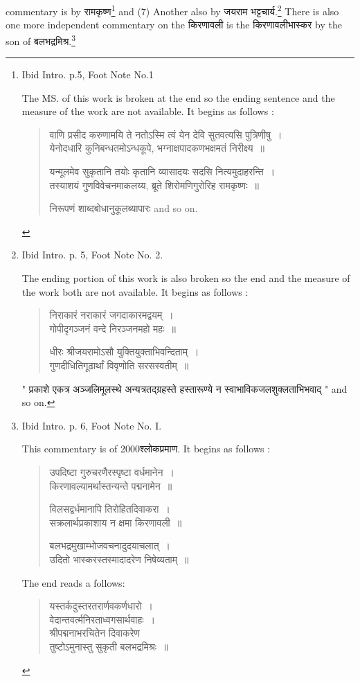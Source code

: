 \documentclass[11pt, openany]{book}
\begin{document}
\newpage
\noindent
commentary is by रामकृष्ण\renewcommand{\thefootnote}{1}\footnote{Ibid Intro. p.5, Foot Note No.1 
 
 The MS. of this work is broken at the end so the ending sentence and the measure of the work are not available. It begins as follows : \textendash
\begin{quote}
{\qt वाणि प्रसीद करुणामयि ते नतोऽस्मि त्वं येन देवि सुतवत्यसि पुत्रिणीषु~।\\
येनोदधारि कुनिबन्धतमोऽन्धकूपे, भग्नाक्षपादकणभक्षमतं निरीक्ष्य~॥

यन्मूलमेव सुकृतानि तयोः कृतानि व्यासादयः सदसि नित्यमुदाहरन्ति~।\\
तस्याशयं गुणविवेचनमाकलय्य, ब्रूते शिरोमणिगुरोरिह रामकृष्णः~॥}
निरूपणं शाब्दबोधानुकूलब्यापारः and so on.
\end{quote}} and (7) Another also by जयराम भट्टचार्य.\renewcommand{\thefootnote}{2}\footnote{Ibid Intro. p. 5, Foot Note No. 2.

 The ending portion of this work is also broken so the end and the measure of the work both are not available. It begins as follows : \textendash
 \begin{quote}
{\qt निराकारं नराकारं जगदाकारमद्वयम्~।\\
गोपीदृगञ्जनं वन्दे निरञ्जनमहो महः~॥

धीरः श्रीजयरामोऽसौ युक्तियुक्ताभिवन्दिताम्~।\\
गुणदीधितिगूढार्थां विवृणोति सरसस्वतीम्~॥}
 \end{quote}
\noindent
" प्रकाशे एकत्र अञ्जलिमूलस्थे अन्यत्रतद्ग्रहस्ते हस्तारूण्ये न स्वाभाविकजलशुक्लताभिभवाद् " and so on.} There is also one more independent commentary on the किरणावली is the किरणावलीभास्कर by the son of बलभद्रमिश्र.\renewcommand{\thefootnote}{3}\footnote{Ibid Intro. p. 6, Foot Note No. I.

This commentary is of 2000श्लोकप्रमाण. It begins as follows : \textendash
\begin{quote}
{\qt उपदिष्टा गुरुचरणैरस्पृष्टा वर्धमानेन~।\\
किरणावल्यामर्थास्तन्यन्ते पद्मनामेन~॥

विलसद्वर्धमानापि तिरोहितदिवाकरा~।\\
सक्रलार्थप्रकाशाय न क्षमा किरणावली~॥

बलभद्रमुखाम्भोजवचनादुदयाचलात्~।\\
उदितो भास्करस्तस्मादादरेण निषेव्यताम्~॥}
\end{quote}
The end reads a follows:\textendash
\begin{quote}
{\qt यस्तर्कदुस्तरतरार्णवकर्णधारो~।\\
वेदान्तवर्त्मनिरताध्वगसार्थवाहः~।\\
श्रीपद्मनाभरचितेन दिवाकरेण\\
तुष्टोऽमुनास्तु सुकृती बलभद्रमिश्रः~॥}
\end{quote}}
\end{document}
